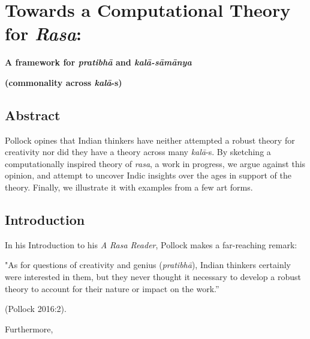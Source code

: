 \chapter[Towards a Computational Theory for \textsl{Rasa}:]{Towards a Computational Theory for \textsl{Rasa}:}\label{chapter\thechapter:begin}

\begin{center}
{\bf A framework for \textsl{pratibhā} and \textsl{kalā-sāmānya} }

{\bf (commonality across \textsl{kalā}-s)}
\end{center}


\section*{Abstract}

Pollock opines that Indian thinkers have neither attempted a robust theory for creativity nor did they have a theory across many \hbox{\textsl{kalā}-s}. By sketching a computationally inspired theory of \textsl{rasa}, a work in progress, we argue against this opinion, and attempt to uncover Indic insights over the ages in support of the theory. Finally, we illustrate it with examples from a few art forms.

\section{Introduction}\label{chap3-sec1}

In his Introduction to his \textsl{A Rasa Reader}, Pollock makes a far-reaching remark:

\begin{myquote}
"As for questions of creativity and genius (\textsl{pratibhā}), Indian thinkers certainly were interested in them, but they never thought it necessary to develop a robust theory to account for their nature or impact on the work.” 

\hfill (Pollock 2016:2).
\end{myquote}

Furthermore, 

